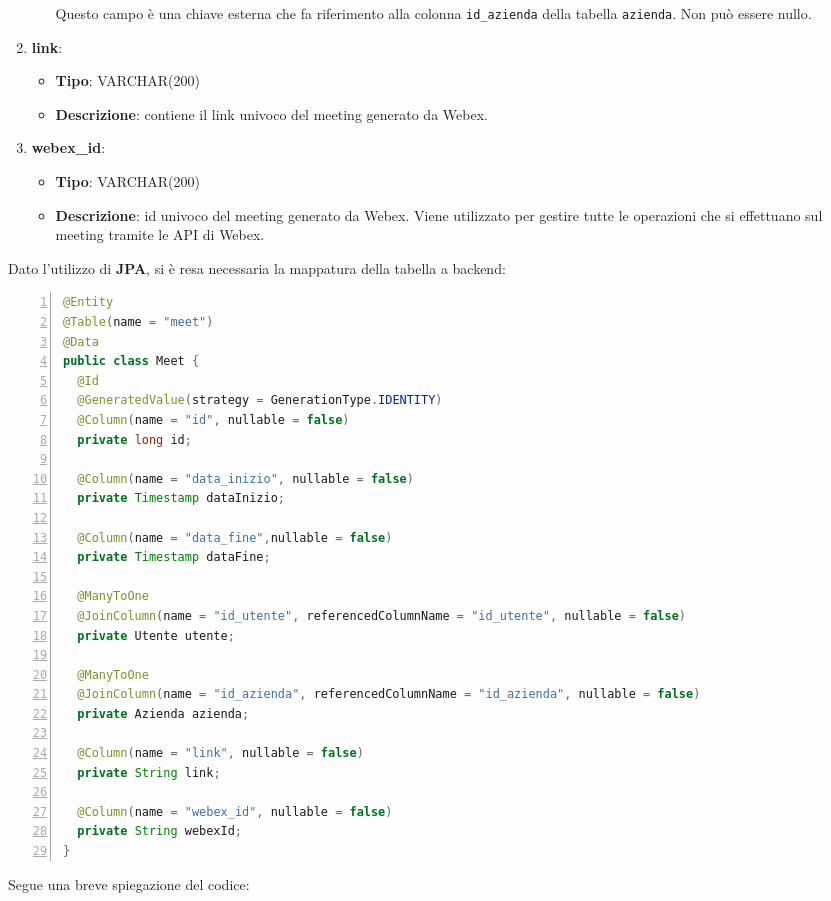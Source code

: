 \begin{enumerate}
\begin{itemize}
            Questo campo è una chiave esterna che fa riferimento alla colonna \texttt{id_azienda} della tabella \texttt{azienda}. 
            Non può essere nullo.
        \end{itemize}
    \item \textbf{link}:
        \begin{itemize}
            \item \textbf{Tipo}: VARCHAR(200)
            \item \textbf{Descrizione}: contiene il link univoco del meeting generato da Webex.
        \end{itemize}
    \item \textbf{webex_id}:
        \begin{itemize}
            \item \textbf{Tipo}: VARCHAR(200)
            \item \textbf{Descrizione}: id univoco del meeting generato da Webex.
            Viene utilizzato per gestire tutte le operazioni che si effettuano sul meeting tramite le API di Webex.
        \end{itemize}
\end{enumerate}
\vspace{20pt}
Dato l'utilizzo di \textbf{JPA}, si è resa necessaria la mappatura della tabella a backend:
\begin{lstlisting}[language=java, frame=lines, basicstyle=\ttfamily\scriptsize, numbers=left]
@Entity
@Table(name = "meet")
@Data
public class Meet {
  @Id
  @GeneratedValue(strategy = GenerationType.IDENTITY)
  @Column(name = "id", nullable = false)
  private long id;
	
  @Column(name = "data_inizio", nullable = false)
  private Timestamp dataInizio;
	
  @Column(name = "data_fine",nullable = false)
  private Timestamp dataFine;
	
  @ManyToOne
  @JoinColumn(name = "id_utente", referencedColumnName = "id_utente", nullable = false)
  private Utente utente;
	
  @ManyToOne
  @JoinColumn(name = "id_azienda", referencedColumnName = "id_azienda", nullable = false)
  private Azienda azienda;
	
  @Column(name = "link", nullable = false)
  private String link;
	
  @Column(name = "webex_id", nullable = false)
  private String webexId;
}
\end{lstlisting}
Segue una breve spiegazione del codice:

